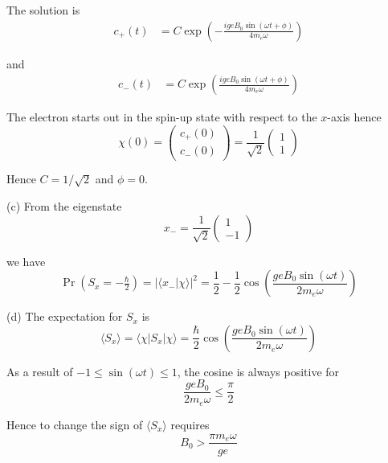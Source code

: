The solution is
\begin{align*}
c_+(t)&=C\exp\left(-\frac{igeB_0\sin(\omega t+\phi)}{4m_e\omega}\right)
\end{align*}

and
\begin{align*}
c_-(t)&=C\exp\left(\frac{igeB_0\sin(\omega t+\phi)}{4m_e\omega}\right)
\end{align*}

The electron starts out in the spin-up state with respect
to the $x$-axis hence
\begin{equation*}
\chi(0)=\begin{pmatrix}c_+(0)\\c_-(0)\end{pmatrix}
=\frac{1}{\sqrt2}\begin{pmatrix}1\\1\end{pmatrix}
\end{equation*}

Hence $C=1/\sqrt2$ and $\phi=0$.

\bigskip
(c) From the eigenstate
\begin{equation*}
x_-=\frac{1}{\sqrt2}\begin{pmatrix}1\\-1\end{pmatrix}
\end{equation*}

we have
\begin{equation*}
\Pr\left(S_x=-\tfrac{\hbar}{2}\right)=\left|\langle x_-|\chi\rangle\right|^2
=\frac{1}{2}-\frac{1}{2}\cos\left(\frac{geB_0\sin(\omega t)}{2m_e\omega}\right)
\end{equation*}

(d) The expectation for $S_x$ is
\begin{equation*}
\langle S_x\rangle=\langle\chi|S_x|\chi\rangle
=\frac{\hbar}{2}\cos\left(\frac{geB_0\sin(\omega t)}{2m_e\omega}\right)
\end{equation*}

As a result of $-1\le\sin(\omega t)\le1$, the cosine is always positive for
\begin{equation*}
\frac{geB_0}{2m_e\omega}\le\frac{\pi}{2}
\end{equation*}

Hence to change the sign of $\langle S_x\rangle$ requires
\begin{equation*}
B_0>\frac{\pi m_e\omega}{ge}
\end{equation*}


